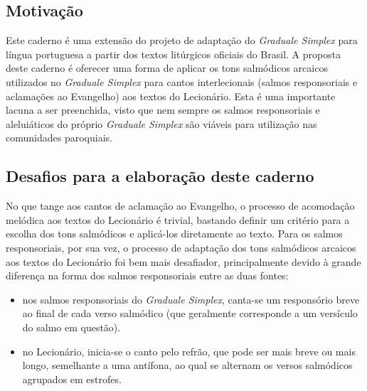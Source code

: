 \newcommand{\GR}{\emph{Graduale Romanum}}
\newcommand{\GS}{\emph{Graduale Simplex}}
\newcommand{\KS}{\emph{Kyriale Simplex}}
\newcommand{\Al}{\emph{Allelúia}}
\newcommand{\Schola}{\emph{schola}}
\newcommand{\ScholaC}{\emph{schola cantorum}}
\newcommand{\FirstPara}[1]{\noindent\textcolor{gregoriocolor}{#1.}}
\newcommand{\Para}[1]{\vspace{\baselineskip}\noindent\textcolor{gregoriocolor}{#1.}}



\subsection{Motivação}

Este caderno é uma extensão do projeto de adaptação do {\GS} para língua portuguesa a partir dos textos litúrgicos oficiais do Brasil. A proposta deste caderno é oferecer uma forma de aplicar os tons salmódicos arcaicos utilizados no {\GS} para cantos interlecionais (salmos responsoriais e aclamações ao Evangelho) aos textos do Lecionário. Esta é uma importante lacuna a ser preenchida, visto que nem sempre os salmos responsoriais e aleluiáticos do próprio {\GS} são viáveis para utilização nas comunidades paroquiais.

\subsection{Desafios para a elaboração deste caderno}

No que tange aos cantos de aclamação ao Evangelho, o processo de acomodação melódica aos textos do Lecionário é trivial, bastando definir um critério para a escolha dos tons salmódicos e aplicá-los diretamente ao texto. Para os salmos responsoriais, por sua vez, o processo de adaptação dos tons salmódicos arcaicos aos textos do Lecionário foi bem mais desafiador, principalmente devido à grande diferença na forma dos salmos responsoriais entre as duas fontes:
\begin{itemize}
  \item nos salmos responsoriais do {\GS}, canta-se um responsório breve ao final de cada verso salmódico (que geralmente corresponde a um versículo do salmo em questão).
  \item no Lecionário, inicia-se o canto pelo refrão, que pode ser mais breve ou mais longo, semelhante a uma antífona, ao qual se alternam os versos salmódicos agrupados em estrofes.
\end{itemize}

